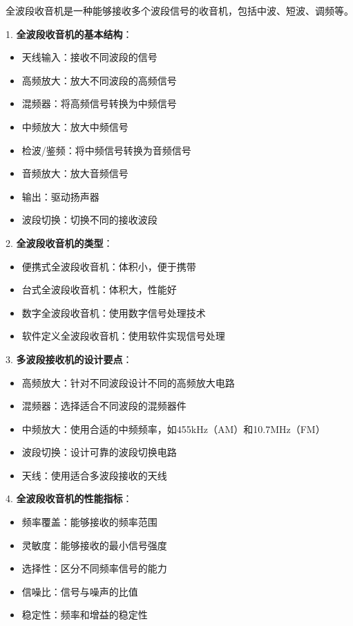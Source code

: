 \documentclass[12pt,UTF8]{ctexbook}
\begin{document}
全波段收音机是一种能够接收多个波段信号的收音机，包括中波、短波、调频等。

1. \textbf{全波段收音机的基本结构}：
   \begin{itemize}[leftmargin=3.5em]
   \item 天线输入：接收不同波段的信号
   \item 高频放大：放大不同波段的高频信号
   \item 混频器：将高频信号转换为中频信号
   \item 中频放大：放大中频信号
   \item 检波/鉴频：将中频信号转换为音频信号
   \item 音频放大：放大音频信号
   \item 输出：驱动扬声器
   \item 波段切换：切换不同的接收波段
   \end{itemize}

2. \textbf{全波段收音机的类型}：
   \begin{itemize}[leftmargin=3.5em]
   \item 便携式全波段收音机：体积小，便于携带
   \item 台式全波段收音机：体积大，性能好
   \item 数字全波段收音机：使用数字信号处理技术
   \item 软件定义全波段收音机：使用软件实现信号处理
   \end{itemize}

3. \textbf{多波段接收机的设计要点}：
   \begin{itemize}[leftmargin=3.5em]
   \item 高频放大：针对不同波段设计不同的高频放大电路
   \item 混频器：选择适合不同波段的混频器件
   \item 中频放大：使用合适的中频频率，如455kHz（AM）和10.7MHz（FM）
   \item 波段切换：设计可靠的波段切换电路
   \item 天线：使用适合多波段接收的天线
   \end{itemize}

4. \textbf{全波段收音机的性能指标}：
   \begin{itemize}[leftmargin=3.5em]
   \item 频率覆盖：能够接收的频率范围
   \item 灵敏度：能够接收的最小信号强度
   \item 选择性：区分不同频率信号的能力
   \item 信噪比：信号与噪声的比值
   \item 稳定性：频率和增益的稳定性
   \end{itemize}
\end{document}
